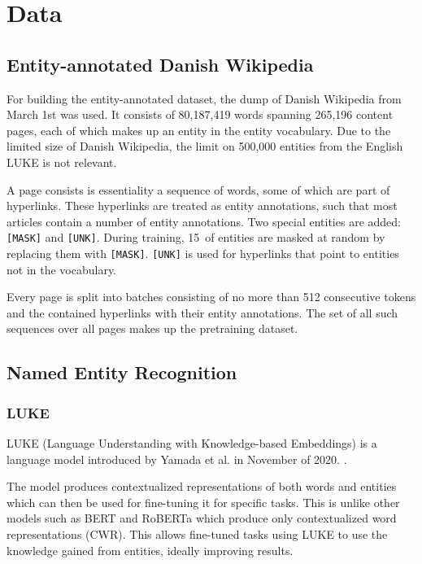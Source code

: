\documentclass[main.tex]{subfiles}
\begin{document}
\chapter{Data}

\section{Entity-annotated Danish Wikipedia}
For building the entity-annotated dataset, the dump of Danish Wikipedia from March 1st was used.
It consists of 80,187,419 words spanning 265,196 content pages, each of which makes up an entity in the entity vocabulary.
Due to the limited size of Danish Wikipedia, the limit on 500,000 entities from the English LUKE is not relevant.

A page consists is essentiality a sequence of words, some of which are part of hyperlinks.
These hyperlinks are treated as entity annotations, such that most articles contain a number of entity annotations.
Two special entities are added: \texttt{[MASK]} and \texttt{[UNK]}.
During training, 15\pro\ of entities are masked at random by replacing them with \texttt{[MASK]}.
\texttt{[UNK]} is used for hyperlinks that point to entities not in the vocabulary.

Every page is split into batches consisting of no more than 512 consecutive tokens and the contained hyperlinks with their entity annotations.
The set of all such sequences over all pages makes up the pretraining dataset.

\section{Named Entity Recognition}

\subsection{LUKE}
LUKE (Language Understanding with Knowledge-based Embeddings) is a language model introduced by Yamada et al. in November of 2020. \cite{yamada2020luke}.

The model produces contextualized representations of both words and entities which can then be used for fine-tuning it for specific tasks.
This is unlike other models such as BERT \cite{devlin2019bert} and RoBERTa \cite{liu2019roberta} which produce only contextualized word representations (CWR).
This allows fine-tuned tasks using LUKE to use the knowledge gained from entities, ideally improving results.
\end{document}

